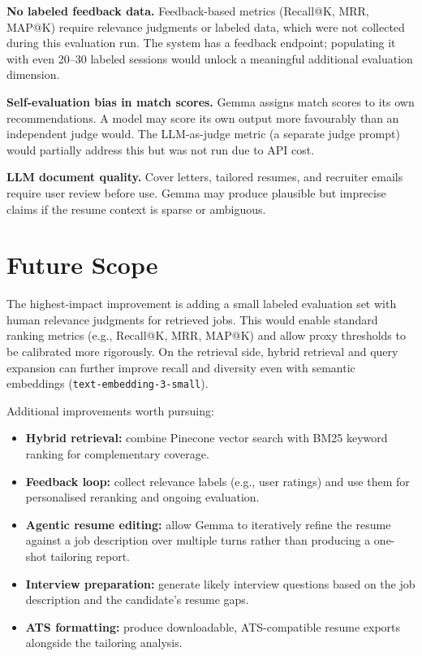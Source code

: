 \documentclass[11pt]{article}
\begin{document}
\textbf{No labeled feedback data.} Feedback-based metrics (Recall@K, MRR, MAP@K) require relevance judgments or labeled data, which were not collected during this evaluation run. The system has a feedback endpoint; populating it with even 20--30 labeled sessions would unlock a meaningful additional evaluation dimension.

\textbf{Self-evaluation bias in match scores.} Gemma assigns match scores to its own recommendations. A model may score its own output more favourably than an independent judge would. The LLM-as-judge metric (a separate judge prompt) would partially address this but was not run due to API cost.

\textbf{LLM document quality.} Cover letters, tailored resumes, and recruiter emails require user review before use. Gemma may produce plausible but imprecise claims if the resume context is sparse or ambiguous.

\section{Future Scope}

The highest-impact improvement is adding a small labeled evaluation set with human relevance judgments for retrieved jobs. This would enable standard ranking metrics (e.g., Recall@K, MRR, MAP@K) and allow proxy thresholds to be calibrated more rigorously. On the retrieval side, hybrid retrieval and query expansion can further improve recall and diversity even with semantic embeddings (\texttt{text-embedding-3-small}).

Additional improvements worth pursuing:

\begin{itemize}
  \item \textbf{Hybrid retrieval:} combine Pinecone vector search with BM25 keyword ranking for complementary coverage.
  \item \textbf{Feedback loop:} collect relevance labels (e.g., user ratings) and use them for personalised reranking and ongoing evaluation.
  \item \textbf{Agentic resume editing:} allow Gemma to iteratively refine the resume against a job description over multiple turns rather than producing a one-shot tailoring report.
  \item \textbf{Interview preparation:} generate likely interview questions based on the job description and the candidate's resume gaps.
  \item \textbf{ATS formatting:} produce downloadable, ATS-compatible resume exports alongside the tailoring analysis.
\end{itemize}
\end{document}
